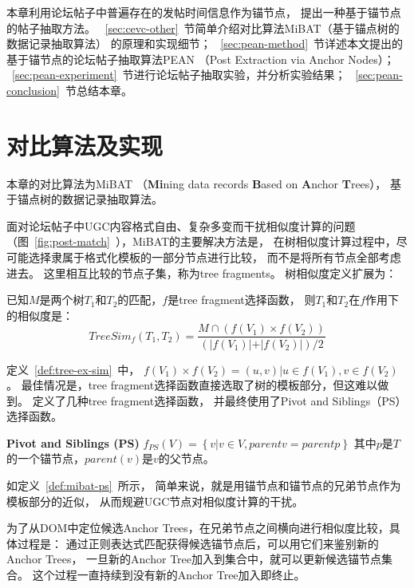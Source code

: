 本章利用论坛帖子中普遍存在的发帖时间信息作为锚节点，
提出一种基于锚节点的帖子抽取方法。
~\ref{sec:cevc-other}~节简单介绍对比算法MiBAT（基于锚点树的数据记录抽取算法）
的原理和实现细节；
~\ref{sec:pean-method}~节详述本文提出的基于锚节点的论坛帖子抽取算法PEAN
（Post Extraction via Anchor Nodes）；
~\ref{sec:pean-experiment}~节进行论坛帖子抽取实验，并分析实验结果；
~\ref{sec:pean-conclusion}~节总结本章。

\section{对比算法及实现}
\label{sec:pean-other}

本章的对比算法为MiBAT
（\textbf{Mi}ning data records 
\textbf{B}ased on \textbf{A}nchor \textbf{T}rees），
基于锚点树的数据记录抽取算法。

面对论坛帖子中UGC内容格式自由、复杂多变而干扰相似度计算的问题
（图~\ref{fig:post-match}~），MiBAT的主要解决方法是，
在树相似度计算过程中，尽可能选择隶属于格式化模板的一部分节点进行比较，
而不是将所有节点全部考虑进去。
这里相互比较的节点子集，称为tree fragments。
树相似度定义扩展为：

\begin{definition}
\label{def:tree-ex-sim}
已知$M$是两个树$T_1$和$T_2$的匹配，$f$是tree fragment选择函数，
则$T_1$和$T_2$在$f$作用下的相似度是：
\begin{equation}
TreeSim_f(T_1, T_2) = \frac{M \cap (f(V_1) \times f(V_2))}
{(\vert f(V_1) \vert + \vert f(V_2) \vert) / 2}
\end{equation}
\end{definition}

定义~\ref{def:tree-ex-sim}~中，
$f(V_1) \times f(V_2) = {(u,v) \vert u \in f(V_1), v \in f(V_2)}$。
最佳情况是，tree fragment选择函数直接选取了树的模板部分，但这难以做到。
\cite{song2010automatic}定义了几种tree fragment选择函数，
并最终使用了Pivot and Siblings（PS）选择函数。

\begin{definition}
\label{def:mibat-ps}
\textbf{Pivot and Siblings (PS)}
$f_{PS}(V) = \left\{ v \vert v \in V, parent{v} = parent{p} \right\}$
其中$p$是$T$的一个锚节点，$parent(v)$是$v$的父节点。
\end{definition}

如定义~\ref{def:mibat-ps}~所示，
简单来说，就是用锚节点和锚节点的兄弟节点作为模板部分的近似，
从而规避UGC节点对相似度计算的干扰。

为了从DOM中定位候选Anchor Trees，在兄弟节点之间横向进行相似度比较，具体过程是：
通过正则表达式匹配获得候选锚节点后，可以用它们来鉴别新的Anchor Trees，
一旦新的Anchor Tree加入到集合中，就可以更新候选锚节点集合。
这个过程一直持续到没有新的Anchor Tree加入即终止。

